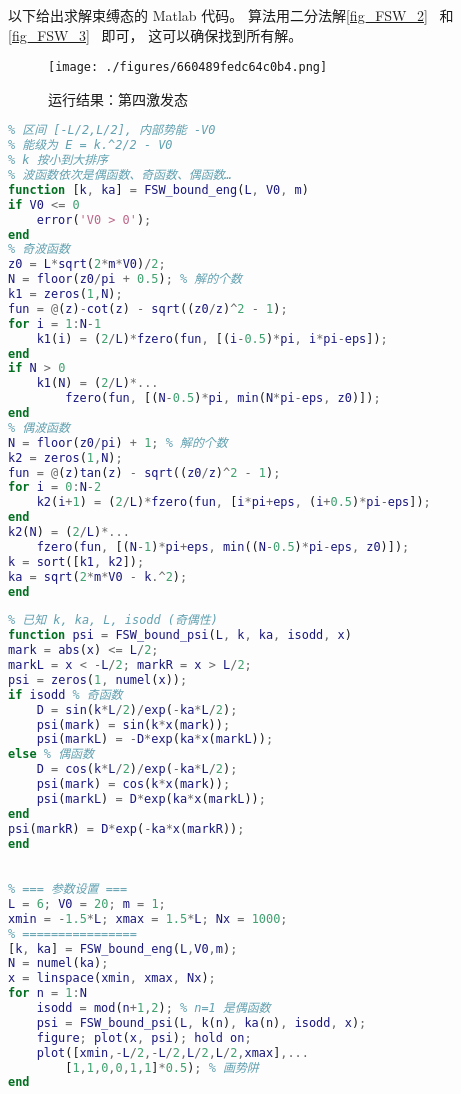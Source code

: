 

以下给出求解束缚态的 Matlab 代码。 算法用二分法解\autoref{fig_FSW_2}~ 和\autoref{fig_FSW_3}~ 即可， 这可以确保找到所有解。

\begin{figure}[ht]
\centering
\texttt{[image: ./figures/660489fedc64c0b4.png]}
\caption{运行结果：第四激发态} \label{fig_FSWmat_1}
\end{figure}

\begin{lstlisting}[language=matlab, caption=FSW\_bound\_eng.m]
% 计算有限深势阱的束缚态参数 k, ka
% 区间 [-L/2,L/2], 内部势能 -V0
% 能级为 E = k.^2/2 - V0
% k 按小到大排序
% 波函数依次是偶函数、奇函数、偶函数…
function [k, ka] = FSW_bound_eng(L, V0, m)
if V0 <= 0
    error('V0 > 0');
end
% 奇波函数
z0 = L*sqrt(2*m*V0)/2;
N = floor(z0/pi + 0.5); % 解的个数
k1 = zeros(1,N);
fun = @(z)-cot(z) - sqrt((z0/z)^2 - 1);
for i = 1:N-1
    k1(i) = (2/L)*fzero(fun, [(i-0.5)*pi, i*pi-eps]);
end
if N > 0
    k1(N) = (2/L)*...
        fzero(fun, [(N-0.5)*pi, min(N*pi-eps, z0)]);
end
% 偶波函数
N = floor(z0/pi) + 1; % 解的个数
k2 = zeros(1,N);
fun = @(z)tan(z) - sqrt((z0/z)^2 - 1);
for i = 0:N-2
    k2(i+1) = (2/L)*fzero(fun, [i*pi+eps, (i+0.5)*pi-eps]);
end
k2(N) = (2/L)*...
    fzero(fun, [(N-1)*pi+eps, min((N-0.5)*pi-eps, z0)]);
k = sort([k1, k2]);
ka = sqrt(2*m*V0 - k.^2);
end
\end{lstlisting}

\begin{lstlisting}[language=matlab, caption=FSW\_bound\_psi.m]
% 已知方势阱束缚态波函数的参数， 求波函数 psi(x)
% 已知 k, ka, L, isodd (奇偶性)
function psi = FSW_bound_psi(L, k, ka, isodd, x)
mark = abs(x) <= L/2;
markL = x < -L/2; markR = x > L/2;
psi = zeros(1, numel(x));
if isodd % 奇函数
    D = sin(k*L/2)/exp(-ka*L/2);
    psi(mark) = sin(k*x(mark));
    psi(markL) = -D*exp(ka*x(markL));
else % 偶函数
    D = cos(k*L/2)/exp(-ka*L/2);
    psi(mark) = cos(k*x(mark));
    psi(markL) = D*exp(ka*x(markL));
end
psi(markR) = D*exp(-ka*x(markR));
end
\end{lstlisting}

\begin{lstlisting}[language=matlab, caption=FSW\_bound\_plt.m]
% 有限深方势阱的波函数画图演示

% === 参数设置 ===
L = 6; V0 = 20; m = 1;
xmin = -1.5*L; xmax = 1.5*L; Nx = 1000;
% ================
[k, ka] = FSW_bound_eng(L,V0,m);
N = numel(ka);
x = linspace(xmin, xmax, Nx);
for n = 1:N
    isodd = mod(n+1,2); % n=1 是偶函数
    psi = FSW_bound_psi(L, k(n), ka(n), isodd, x);
    figure; plot(x, psi); hold on;
    plot([xmin,-L/2,-L/2,L/2,L/2,xmax],...
        [1,1,0,0,1,1]*0.5); % 画势阱
end
\end{lstlisting}
